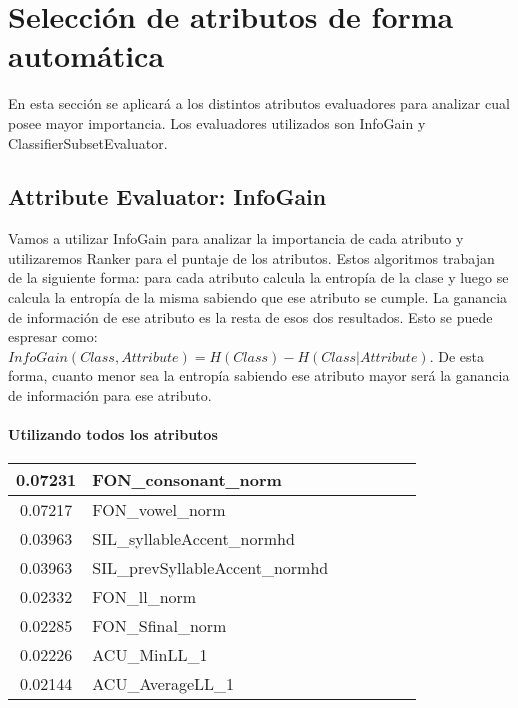 \section{Selección de atributos de forma automática}

En esta sección se aplicará a los distintos atributos evaluadores para analizar cual posee mayor importancia. Los evaluadores utilizados son InfoGain y ClassifierSubsetEvaluator. 

\subsection*{Attribute Evaluator: InfoGain}

Vamos a utilizar InfoGain para analizar la importancia de cada atributo y utilizaremos Ranker para el puntaje de los atributos. Estos algoritmos trabajan de la siguiente forma: para cada atributo calcula la entropía de la clase y luego se calcula la entropía de la misma sabiendo que ese atributo se cumple. La ganancia de información de ese atributo es la resta de esos dos resultados. Esto se puede espresar como: $InfoGain(Class,Attribute) = H(Class) - H(Class | Attribute)$. De esta forma, cuanto menor sea la entropía sabiendo ese atributo mayor será la ganancia de información para ese atributo.

\paragraph*{Utilizando todos los atributos}

\begin{table}[H]
\centering
\begin{tabular}{|c|l|c|c|c|c|c|}
\hline
 0.07231     & FON\_consonant\_norm \\ \hline
 0.07217     & FON\_vowel\_norm \\ \hline
 0.03963     & SIL\_syllableAccent\_normhd \\ \hline
 0.03963     & SIL\_prevSyllableAccent\_normhd \\ \hline
 0.02332     & FON\_ll\_norm \\ \hline
 0.02285     & FON\_Sfinal\_norm \\ \hline
 0.02226     & ACU\_MinLL\_1 \\ \hline
 0.02144     & ACU\_AverageLL\_1 \\ \hline
 
\end{tabular}
\end{table}

